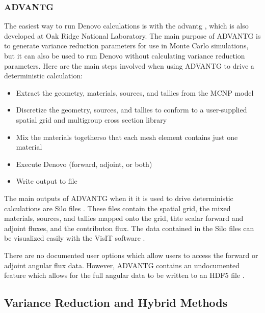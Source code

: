 \subsubsection{ADVANTG}
\label{sec:bg:rt:determ:advantg}

The easiest way to run Denovo calculations is with the \ac{advantg} \cite{advantg}, which is also developed at Oak Ridge National Laboratory.
The main purpose of ADVANTG is to generate variance reduction parameters for use in Monte Carlo simulations, but it can also be used to run Denovo without calculating variance reduction parameters.
Here are the main steps involved when using ADVANTG to drive a deterministic calculation:

\begin{itemize}
  \item Extract the geometry, materials, sources, and tallies from the MCNP model
  \item Discretize the geometry, sources, and tallies to conform to a user-supplied spatial grid and multigroup cross section library
  \item Mix the materials togetherso that each mesh element contains just one material
  \item Execute Denovo (forward, adjoint, or both)
  \item Write output to file
\end{itemize}

The main outputs of ADVANTG when it it is used to drive deterministic calculations are Silo files \cite{silo}.
These files contain the spatial grid, the mixed materials, sources, and tallies mapped onto the grid, thte scalar forward and adjoint fluxes, and the contributon flux.
The data contained in the Silo files can be visualized easily with the VisIT software \cite{visit}.

There are no documented user options which allow users to access the forward or adjoint angular flux data.
However, ADVANTG contains an undocumented feature which allows for the full angular data to be written to an HDF5 file \cite{hdf5}.

\subsection{Variance Reduction and Hybrid Methods}
\label{sec:bg:rt:vr}
